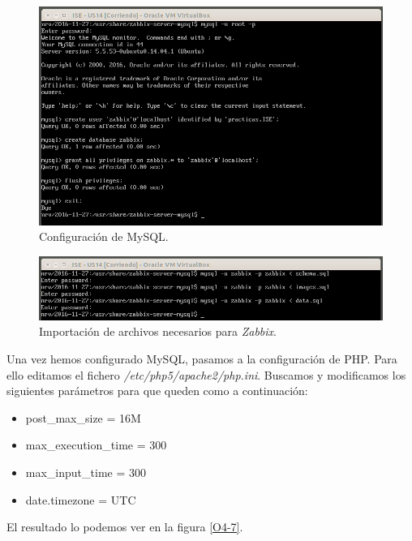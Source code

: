 \documentclass[a4paper,titlepage,12pt]{scrartcl}	%
\numberwithin{figure}{section} %
\numberwithin{table}{section} %
\begin{document}
	\begin{figure}[H]
		\includegraphics[width=\linewidth]{./Imagenes/O4-5.png}
		\vspace{-0.5cm}
		\caption[Configuración de MySQL.]{Configuración de MySQL.}
		\label{O4-5}
	\end{figure}
	
	\begin{figure}[H]
		\includegraphics[width=\linewidth]{./Imagenes/O4-6.png}
		\vspace{-0.5cm}
		\caption[Importación de archivos necesarios para \textit{Zabbix}.]{Importación de archivos necesarios para \textit{Zabbix}.}
		\label{O4-6}
	\end{figure}
	
	Una vez hemos configurado MySQL, pasamos a la configuración de PHP. Para ello editamos el fichero \textit{/etc/php5/apache2/php.ini}. Buscamos y modificamos los siguientes parámetros para que queden como a continuación: 
	
	\begin{itemize}
		\item post\_max\_size = 16M
		\item max\_execution\_time = 300
		\item max\_input\_time = 300
		\item date.timezone = UTC
	\end{itemize}
	
	El resultado lo podemos ver en la figura \ref{O4-7}.
	
\end{document}
